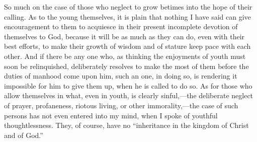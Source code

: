 So much on the case of those who neglect to grow
betimes into the hope of their calling. As to the young
themselves, it is plain that nothing I have said can give
encouragement to them to acquiesce in their present
incomplete devotion of themselves to God, because it will
be as much as they can do, even with their best efforts,
to make their growth of wisdom and of stature keep pace
with each other. And if there be any one who, as thinking
the enjoyments of youth must soon be relinquished, deliberately resolves to make the most of them before the
duties of manhood come upon him, such an one, in doing
so, is rendering it impossible for him to give them up,
when he is called to do so. As for those who allow
themselves in what, even in youth, is clearly
sinful,—the deliberate neglect of prayer,
profaneness, riotous living, or other
immorality,—the case of such persons has not even
entered into my mind, when I spoke of youthful
thoughtlessness. They, of course, have no
``inheritance in the kingdom of Christ and of
God.''

